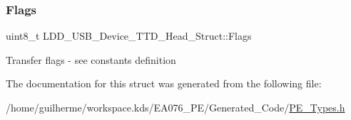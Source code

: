 \subsubsection{\texorpdfstring{Flags}{Flags}}
{\footnotesize\ttfamily uint8\+\_\+t L\+D\+D\+\_\+\+U\+S\+B\+\_\+\+Device\+\_\+\+T\+T\+D\+\_\+\+Head\+\_\+\+Struct\+::\+Flags}

Transfer flags -\/ see constants definition 

The documentation for this struct was generated from the following file\+:\begin{DoxyCompactItemize}
\item 
/home/guilherme/workspace.\+kds/\+E\+A076\+\_\+\+P\+E/\+Generated\+\_\+\+Code/\hyperlink{_p_e___types_8h}{P\+E\+\_\+\+Types.\+h}\end{DoxyCompactItemize}
